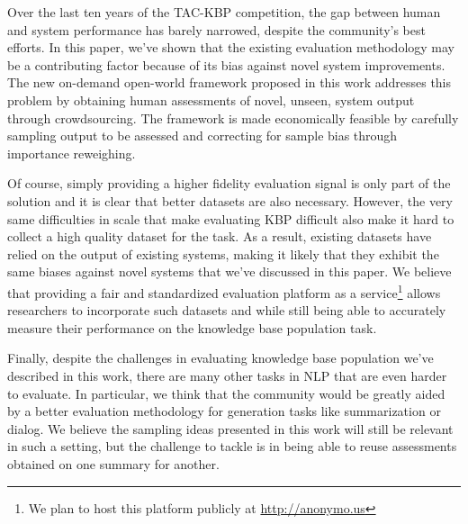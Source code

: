 Over the last ten years of the TAC-KBP competition, the gap between human and system performance has barely narrowed, despite the community's best efforts.
In this paper, we've shown that the existing evaluation methodology may be a contributing factor because of its bias against novel system improvements.
The new on-demand open-world framework proposed in this work addresses this problem by obtaining human assessments of novel, unseen, system output through crowdsourcing.
The framework is made economically feasible by carefully sampling output to be assessed and correcting for sample bias through importance reweighing.

Of course, simply providing a higher fidelity evaluation signal is only part of the solution and it is clear that better datasets are also necessary.
However, the very same difficulties in scale that make evaluating KBP difficult also make it hard to collect a high quality dataset for the task.
As a result, existing datasets \citep{angeli2014combining,adel2016comparing} have relied on the output of existing systems, making it likely that they exhibit the same biases against novel systems that we've discussed in this paper.
We believe that providing a fair and standardized evaluation platform as a service\footnote{We plan to host this platform publicly at \url{http://anonymo.us}} 
allows researchers to incorporate such datasets and while still being able to accurately measure their performance on the knowledge base population task.

Finally, despite the challenges in evaluating knowledge base population we've described in this work, there are many other tasks in NLP that are even harder to evaluate.
In particular, we think that the community would be greatly aided by a better evaluation methodology for generation tasks like summarization or dialog.
We believe the sampling ideas presented in this work will still be relevant in such a setting, but the challenge to tackle is in being able to reuse assessments obtained on one summary for another.
